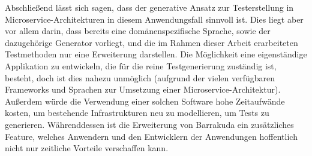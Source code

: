 \documentclass[12pt,a4paper,bibliography=totocnumbered,listof=totocnumbered]{scrartcl}
\begin{document}
Abschließend lässt sich sagen, dass der generative Ansatz zur Testerstellung in Microservice-Architekturen in diesem Anwendungsfall sinnvoll ist. Dies liegt aber vor allem darin, dass bereits eine domänenspezifische Sprache, sowie der dazugehörige Generator vorliegt, und die im Rahmen dieser Arbeit erarbeiteten Testmethoden nur eine Erweiterung darstellen. Die Möglichkeit eine eigenständige Applikation zu entwickeln, die für die reine Testgenerierung zuständig ist, besteht, doch ist dies nahezu unmöglich (aufgrund der vielen verfügbaren Frameworks und Sprachen zur Umsetzung einer Microservice-Architektur). Außerdem würde die Verwendung einer solchen Software hohe Zeitaufwände kosten, um bestehende Infrastrukturen neu zu modellieren, um Tests zu generieren. Währenddessen ist die Erweiterung von Barrakuda ein zusätzliches Feature, welches Anwendern und den Entwicklern der Anwendungen hoffentlich nicht nur zeitliche Vorteile verschaffen kann.

\renewcommand\refname{Quellenverzeichnis}


\pagebreak

\setcounter{page}{1}
\end{document}

